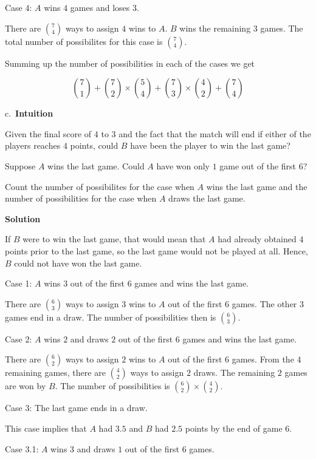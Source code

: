 \documentclass[]{book}
\begin{document}
Case 4: \(A\) wins \(4\) games and loses \(3\).

There are \({7 \choose 4}\) ways to assign \(4\) wins to \(A\). \(B\)
wins the remaining \(3\) games. The total number of possibilites for
this case is \({7 \choose 4}\).

Summing up the number of possibilities in each of the cases we get

\[ {7 \choose 1} + {7 \choose 2} \times {5 \choose 4} + {7 \choose 3} \times {4 \choose 2} + {7 \choose 4} \]

c.~\textbf{Intuition}

Given the final score of \(4\) to \(3\) and the fact that the match will
end if either of the players reaches \(4\) points, could \(B\) have been
the player to win the last game?

Suppose \(A\) wins the last game. Could \(A\) have won only \(1\) game
out of the first \(6\)?

Count the number of possibilites for the case when \(A\) wins the last
game and the number of possibilities for the case when \(A\) draws the
last game.

 \textbf{Solution}

If \(B\) were to win the last game, that would mean that \(A\) had
already obtained \(4\) points prior to the last game, so the last game
would not be played at all. Hence, \(B\) could not have won the last
game.

Case 1: \(A\) wins \(3\) out of the first \(6\) games and wins the last
game.

There are \({6 \choose 3}\) ways to assign \(3\) wins to \(A\) out of
the first \(6\) games. The other \(3\) games end in a draw. The number
of possibilities then is \({6 \choose 3}\).

Case 2: \(A\) wins \(2\) and draws \(2\) out of the first \(6\) games
and wins the last game.

There are \({6 \choose 2}\) ways to assign \(2\) wins to \(A\) out of
the first \(6\) games. From the \(4\) remaining games, there are
\({4 \choose 2}\) ways to assign \(2\) draws. The remaining \(2\) games
are won by \(B\). The number of possibilities is
\({6 \choose 2} \times {4 \choose 2}\).

Case 3: The last game ends in a draw.

This case implies that \(A\) had \(3.5\) and \(B\) had \(2.5\) points by
the end of game \(6\).

Case 3.1: \(A\) wins \(3\) and draws \(1\) out of the first \(6\) games.
\end{document}
